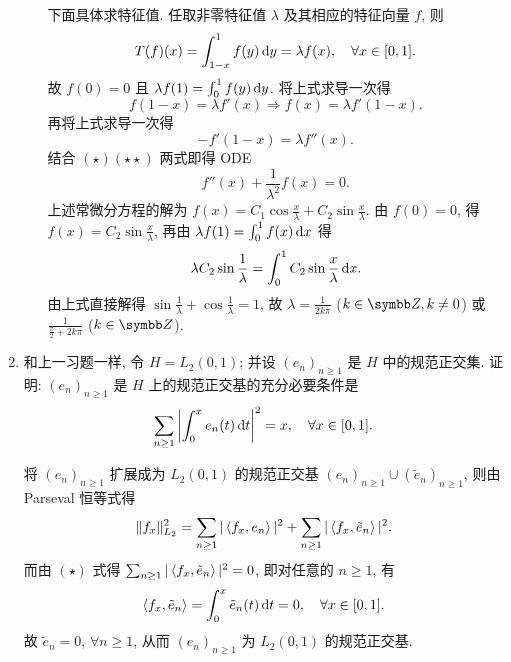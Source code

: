 \begin{enumerate}
\begin{answer}
\begin{enumerate}
        下面具体求特征值. 任取非零特征值 $\lambda$ 及其相应的特征向量 $f$, 则
        \[T(f)(x)=\int_{1-x}^1 f(y)\mathop{}\!\mathrm{d} y=\lambda f(x),\quad\forall x\in [0,1].\]
        故 $f(0)=0$ 且 $\lambda f(1)=\int_0^1 f(y)\mathop{}\!\mathrm{d} y$. 将上式求导一次得
        \begin{equation}
            f(1-x)=\lambda f'(x)\Longrightarrow f(x)=\lambda f'(1-x).\tag{$\star$}
        \end{equation}
        再将上式求导一次得
        \begin{equation}
            -f'(1-x)=\lambda f''(x).\tag{$\star\star$}
        \end{equation}
        结合 $(\star)(\star\star)$ 两式即得 ODE
        \[f''(x)+\frac{1}{\lambda^2}f(x)=0.\]
        上述常微分方程的解为 $f(x)=C_1\cos\frac{x}{\lambda}+C_2\sin\frac{x}{\lambda}$.
        由 $f(0)=0$, 得 $f(x)=C_2\sin\frac{x}{\lambda}$, 再由 $\lambda f(1)=\int_0^1 f(x)\mathop{}\!\mathrm{d} x$ 得
        \[\lambda C_2\sin\frac{1}{\lambda}=\int_0^1 C_2\sin\frac{x}{\lambda}\mathop{}\!\mathrm{d} x.\]
        由上式直接解得 $\sin\frac{1}{\lambda}+\cos\frac{1}{\lambda}=1$,
        故 $\lambda=\frac{1}{2k\pi}$ ($k\in\Z,k\neq 0$) 或 $\frac{1}{\frac{\pi}{2}+2k\pi}$ ($k\in\Z$).
      \end{enumerate}
    \end{answer}
  \item 和上一习题一样, 令 $H=L_{2}(0,1)$; 并设 $\left(e_{n}\right)_{n \geq 1}$ 是 $H$ 中的规范正交集. 
  证明: $\left(e_{n}\right)_{n \geq 1}$ 是 $H$ 上的规范正交基的充分必要条件是
  \[
  \sum_{n\geq 1}\left|\int_{0}^{x} e_{n}(t)\mathop{}\!\mathrm{d} t\right|^{2}=x, \quad \forall x \in[0,1].
  \]
    \begin{answer}[][取 $f_x=\mathbb{1}_{(0,x)}$, 由 Parseval 恒等式得 
      \begin{equation}
          \|f_x\|_{L_2}^2=\sum_{n\geq 1}|\innerp{f_x}{e_n}|^2,\tag{$\star$}
      \end{equation}
      换个马甲即为
      \[x=\sum_{n\geq 1}\left|\int_{0}^{x} e_{n}(t)\diff t\right|^{2}.\]]

      将 $(e_n)_{n\geq 1}$ 扩展成为 $L_2(0,1)$ 的规范正交基 $(e_n)_{n\geq 1}\cup(\tilde{e}_n)_{n\geq 1}$,
      则由 Parseval 恒等式得
      \[\|f_x\|_{L_2}^2=\sum_{n\geq 1}|\left\langle f_x,e_n\right\rangle|^2+\sum_{n\geq 1}|\left\langle f_x,\tilde{e}_n\right\rangle|^2.\]
      而由 $(\star)$ 式得 $\sum_{n\geq 1}|\left\langle f_x,\tilde{e}_n\right\rangle|^2=0$, 即对任意的 $n\geq 1$, 有
      \[\left\langle f_x,\tilde{e}_n\right\rangle=\int_0^x \tilde{e}_n(t)\mathop{}\!\mathrm{d} t=0,\quad\forall x\in [0,1].\]
      故 $\tilde{e}_n=0$, $\forall n\geq 1$, 从而 $(e_n)_{n\geq 1}$ 为 $L_2(0,1)$ 的规范正交基.
    \end{answer}
\end{enumerate}
